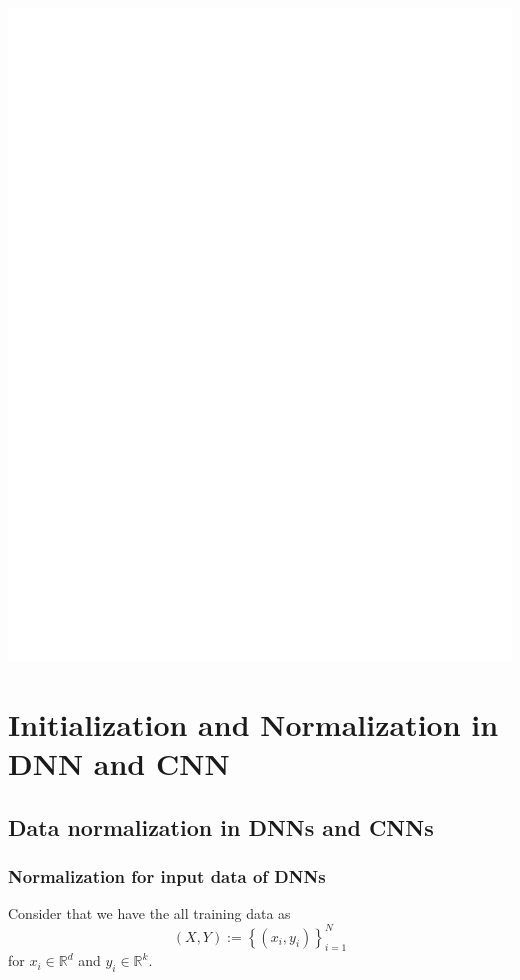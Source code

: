\documentclass[10pt]{article}
\begin{document}
\includegraphics[max width=\textwidth]{2022_01_06_7122b544778bcd520335g-02}

\section{Initialization and Normalization in DNN and CNN}
\subsection{Data normalization in DNNs and CNNs}
\subsubsection{Normalization for input data of DNNs}
Consider that we have the all training data as
$$
(X, Y):=\left\{\left(x_{i}, y_{i}\right)\right\}_{i=1}^{N}
$$
for $x_{i} \in \mathbb{R}^{d}$ and $y_{i} \in \mathbb{R}^{k}$.
\end{document}
